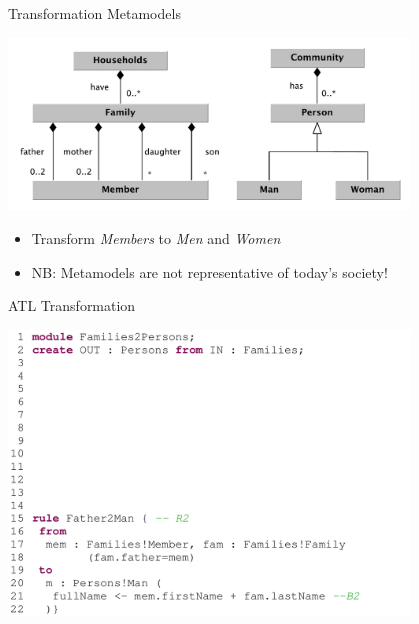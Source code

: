 \documentclass[xcolor=dvipsnames, 12pt]{beamer}
\begin{document}

\begin{frame}{Transformation Metamodels}

\begin{center}
\includegraphics[width=0.8\textwidth]{figures/Metamodels_F2P}
\end{center}
\begin{itemize}[<+->]
\item Transform \textit{Members} to \textit{Men} and \textit{Women}
\item NB: Metamodels are not representative of today's society!
\end{itemize}
\end{frame}

\begin{frame}{ATL Transformation}
\begin{center}
\includegraphics[width=0.8\textwidth]{figures/ATL_code_first}
\end{center}
\end{frame}
\end{document}
